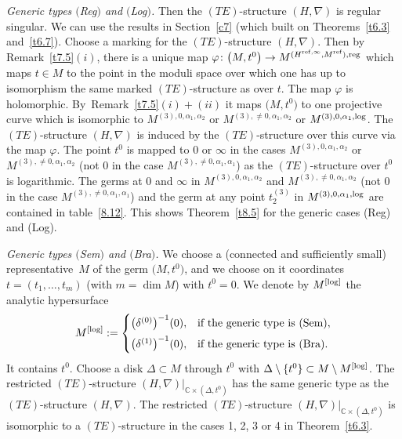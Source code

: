 \documentclass[pdftex]{sigma}%
\numberwithin{equation}{section}
\numberwithin{figure}{section}
\newcommand{\C}{{\mathbb C}}
\newcommand{\nnn}{\nabla}
\begin{document}
\medskip\noindent
{\it Generic types $($Reg$)$ and $($Log$)$.}
Then the $(TE)$-structure $(H,\nnn)$ is regular singular.
We can use the results in Section~\ref{c7}
(which built on Theorems~\ref{t6.3} and~\ref{t6.7}).
Choose a marking for the $(TE)$-structure $(H,\nnn)$.
Then by Remark~\ref{t7.5}$(i)$, there is a unique map
$\varphi\colon \big(M,t^0\big)\to M^{(H^{{\rm ref},\infty},M^{\rm ref}),{\rm reg}}$
which maps $t\in M$ to the point in the moduli space
over which one has up to isomorphism the same
marked $(TE)$-structure as over $t$. The map
$\varphi$ is holomorphic. By~Re\-mark~\ref{t7.5}$(i){+}(ii)$
it maps $\big(M,t^0\big)$ to one projective curve
which is isomorphic to
$M^{(3),0,\alpha_1,\alpha_2}$ or
$M^{(3),\neq 0,\alpha_1,\alpha_2}$ or
$M^{(3),0,\alpha_1,{\rm log}}$.
The $(TE)$-structure $(H,\nnn)$ is induced by the
$(TE)$-structure over this curve via the map $\varphi$.
The point $t^0$ is mapped to $0$ or $\infty$ in the
cases $M^{(3),0,\alpha_1,\alpha_2}$ or~$M^{(3),\neq 0,\alpha_1,\alpha_2}$
\big(not 0 in the case $M^{(3),\neq 0,\alpha_1,\alpha_1}$\big)
as the $(TE)$-structure over $t^0$ is logarithmic.
The germs at $0$ and $\infty$ in
$M^{(3),0,\alpha_1,\alpha_2}$ and
$M^{(3),\neq 0,\alpha_1,\alpha_2}$
\big(not 0 in the case $M^{(3),\neq 0,\alpha_1,\alpha_1}$\big)
and the germ at any point $t_2^{(3)}$ in
$M^{(3),0,\alpha_1,{\rm log}}$ are contained in table~\eqref{8.12}.
This shows Theorem~\ref{t8.5} for the generic
cases (Reg) and (Log).

\medskip\noindent
{\it Generic types $($Sem$)$ and $($Bra$)$.}
We choose a (connected and sufficiently small)
representative~$M$ of the germ
$\big(M,t^0\big)$, and we choose on it coordinates
$t=(t_1,\dots ,t_m)$ (with $m=\dim M$) with $t^0=0$.
We denote by $M^{\rm [log]}$ the analytic hypersurface
\begin{gather*}%
M^{\rm [log]}:=\begin{cases}
\big(\delta^{(0)}\big)^{-1}(0),&\text{if the generic type is (Sem)},
\\[1ex]
\big(\delta^{(1)}\big)^{-1}(0),&\text{if the generic type is (Bra)}.
\end{cases}
\end{gather*}
It contains $t^0$.
Choose a disk $\Delta\subset M$ through $t^0$ with
$\Delta\setminus \{t^0\}\subset M\setminus M^{\rm [log]}$.
The restricted $(TE)$-structure
$(H,\nnn)|_{\C\times(\Delta,t^0)}$ has the same
generic type as the $(TE)$-structure $(H,\nnn)$.
The restricted $(TE)$-structure
$(H,\nnn)|_{\C\times(\Delta,t^0)}$
is isomorphic to a $(TE)$-structure in the cases
1, 2, 3 or 4 in Theorem~\ref{t6.3}.
\end{document}
